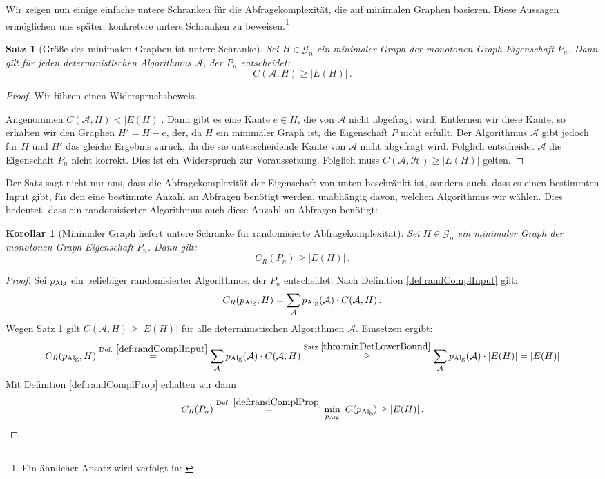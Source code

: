 \documentclass[10pt,a4paper, footheight=1mm]{scrreprt}
\newtheorem{Satz}[definition]{Satz}
\newtheorem{corollary}[definition]{Korollar}
\theoremstyle{definition}
\begin{document}
Wir zeigen nun einige einfache untere Schranken
für die Abfragekomplexität, die auf minimalen
Graphen basieren. Diese Aussagen ermöglichen uns
später, konkretere untere Schranken zu beweisen.\footnote{
Ein ähnlicher Ansatz wird verfolgt in: \cite{Groeger}}
\begin{Satz}[Größe des minimalen Graphen ist untere Schranke]
\label{thm:minDetLowerBound}
Sei $H\in \mathcal{G}_n$ ein minimaler Graph der monotonen
Graph-Eigenschaft $P_n$. Dann gilt für jeden deterministischen
Algorithmus $\mathcal{A}$, der $P_n$ entscheidet:
$$ C(\mathcal{A},H) \geq |E(H)|\,.$$
\end{Satz}
\begin{proof}
Wir führen einen Widerspruchsbeweis.

Angenommen $ C(\mathcal{A},H) < |E(H)| $.
Dann gibt es eine Kante $e\in H$,
die von $\mathcal{A}$ nicht abgefragt wird. Entfernen wir
diese Kante, so erhalten wir den Graphen $H' = H - e$, der,
da $H$ ein minimaler Graph ist, die Eigenschaft $P$ nicht
erfüllt. Der Algorithmus $\mathcal{A}$ gibt jedoch für $H$ und $H'$ das gleiche
Ergebnis zurück, da die sie unterscheidende Kante von $\mathcal{A}$
nicht abgefragt wird. Folglich entscheidet $\mathcal{A}$ die
Eigenschaft $P_n$ nicht korrekt. Dies ist ein Widerspruch zur
Voraussetzung. Folglich muss $ C(\mathcal{A,H}) \geq |E(H)| $ gelten. 
\end{proof}
Der Satz sagt nicht nur aus, dass die Abfragekomplexität
der Eigenschaft von unten beschränkt ist, sondern auch, dass
es einen bestimmten Input gibt, für den eine bestimmte Anzahl
an Abfragen benötigt werden, unabhängig davon, welchen Algorithmus
wir wählen. Dies bedeutet, dass ein randomisierter Algorithmus
auch diese Anzahl an Abfragen benötigt:
\begin{corollary}[Minimaler Graph liefert untere Schranke für 
                  randomisierte Abfragekomplexität]
\label{cor:MinGraphRandCompl}
Sei $H\in \mathcal{G}_n$ ein minimaler Graph der monotonen
Graph-Eigenschaft $P_n$. Dann gilt:
$$C_R(P_n) \geq |E(H)|\,.$$
\end{corollary}
\begin{proof}
Sei $p_\textup{Alg}$ ein beliebiger randomisierter Algorithmus,
der $P_n$ entscheidet.
Nach Definition \ref{def:randComplInput} gilt: 
$$ C_R(p_\textup{Alg}, H) = 
\sum_\mathcal{A} p_\textup{Alg}(\mathcal{A}) \cdot C(\mathcal{A}, H)\,.$$
Wegen Satz \ref{thm:minDetLowerBound} gilt $C(\mathcal{A}, H) \geq |E(H)|$
für alle deterministischen Algorithmen $\mathcal{A}$. Einsetzen ergibt:
$$ C_R(p_\textup{Alg}, H) \overset{\textup{Def. } \ref{def:randComplInput}} {=}
\sum_\mathcal{A} p_\textup{Alg}(\mathcal{A}) \cdot C(\mathcal{A}, H) 
\overset{\textup{Satz } \ref{thm:minDetLowerBound}} {\geq}
\sum_\mathcal{A} p_\textup{Alg}(\mathcal{A}) \cdot |E(H)| =
|E(H)| $$
Mit Definition \ref{def:randComplProp} erhalten wir dann
\begin{equation*}
C_R(P_n) \overset{\textup{Def. } \ref{def:randComplProp}} {=} 
\min_{p_\textup{Alg}}\ C(p_\textup{Alg}) \geq |E(H)|\,. \qedhere
\end{equation*}
\end{proof}
\end{document}
